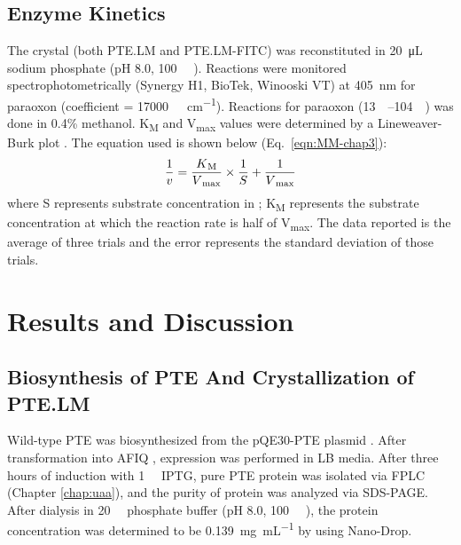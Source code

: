 \begin{refsection}
\subsection{Enzyme Kinetics}

The crystal (both PTE.LM and PTE.LM-FITC) was reconstituted in
\SI{20}{\micro\liter} sodium phosphate (pH 8.0, \SI{100}{\micro\Molar}
). Reactions were monitored spectrophotometrically (Synergy H1,
BioTek, Winooski VT) at \SI{405}{\nm} for paraoxon (coefficient =
\SI{17000}{\per\Molar\per\cm}).  Reactions for paraoxon
(\SIrange{13}{104}{\micro\Molar}) was done in 0.4\% methanol.
K\textsubscript{M} and V\textsubscript{max} values were determined by a
Lineweaver-Burk plot \cite{Baker2011b}. The equation used is shown below
(Eq.~\ref{eqn:MM-chap3}): 
\begin{equation} 
    \frac{1}{v} =
    \frac{K\textsubscript{M}}{V\textsubscript{max}}\times\frac{1}{S} +
    \frac{1}{V\textsubscript{max}} 
    \label{eqn:MM-chap3}
\end{equation}
where S represents substrate concentration in \si{\Molar}; K\textsubscript{M}
represents the substrate concentration at which the reaction rate is half of
V\textsubscript{max}. The data reported is the average of three trials and the
error represents the standard deviation of those trials.

\section{Results and Discussion}

\subsection{Biosynthesis of PTE And Crystallization of PTE.LM}

Wild-type PTE was biosynthesized from the pQE30-PTE plasmid \cite{Yang2014a}.
After transformation into AFIQ  \cite{Baker2011b}, expression
was performed in LB media. After three hours of induction with
\SI{1}{\milli\Molar} IPTG, pure PTE protein was isolated via FPLC (Chapter
\ref{chap:uaa}), and the purity of protein was analyzed via SDS-PAGE. After
dialysis in \SI{20}{\milli\Molar} phosphate buffer (pH 8.0,
\SI{100}{\micro\Molar} ), the protein concentration was determined to
be \SI{0.139}{\mg\per\mL} by using Nano-Drop.


\end{refsection}
